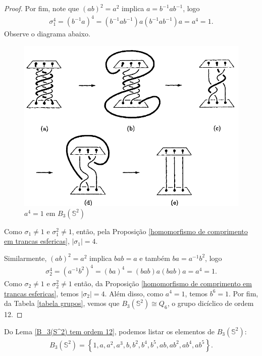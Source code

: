 \begin{proof}
		\par\vspace{0.3cm} Por fim, note que $(ab)^2 = a^2$ implica $a = b^{-1}ab^{-1}$, logo
		\begin{align*}
		    \sigma_1^4 = (b^{-1}a)^4 = (b^{-1}ab^{-1})a(b^{-1}ab^{-1})a = a^4 = 1.
		\end{align*}  
		Observe o diagrama abaixo.
		\begin{figure}[H]
			\begin{center}
				\includegraphics[width=12cm]{Images/manipulacao_de_a4.png}
			\end{center}\caption{$a^4 = 1$ em $B_3(\mathbb{S}^2)$}
		\end{figure}
		Como $\sigma_1\neq 1$ e $\sigma_1^2\neq 1$, então, pela 
		Proposição \ref{homomorfismo de comprimento em trancas esfericas}, $|\sigma_1| = 4$.
		
		\par\vspace{0.3cm} Similarmente, $(ab)^2 = a^2$ implica $bab=a$ e também $ba=a^{-1}b^2$, logo
		\begin{align*}
		    \sigma_2^4 = (a^{-1}b^2)^4 = (ba)^4 = (bab)a(bab)a = a^4 = 1.
		\end{align*}
		Como $\sigma_2\neq1$ e $\sigma_2^2\neq1$ então, da 
		Proposição \ref{homomorfismo de comprimento em trancas esfericas}, temos $|\sigma_2|=4$.
		Além disso, como $a^4 = 1$, temos $b^6=1$.
		Por fim, da Tabela \ref{tabela grupos}, vemos que $B_3(\mathbb{S}^2)\cong Q_6$, 
		o grupo dicíclico de ordem 12.
	\end{proof}
	Do Lema \ref{B_3(S^2) tem ordem 12}, podemos listar os elementos de $B_3(\mathbb{S}^2)$:
	\begin{align*}
	    B_3(\mathbb{S}^2) = \left\{ 1, a, a^2, a^3, b, b^2, b^4, b^5, ab, ab^2, ab^4, ab^5 \right\}.
	\end{align*}
